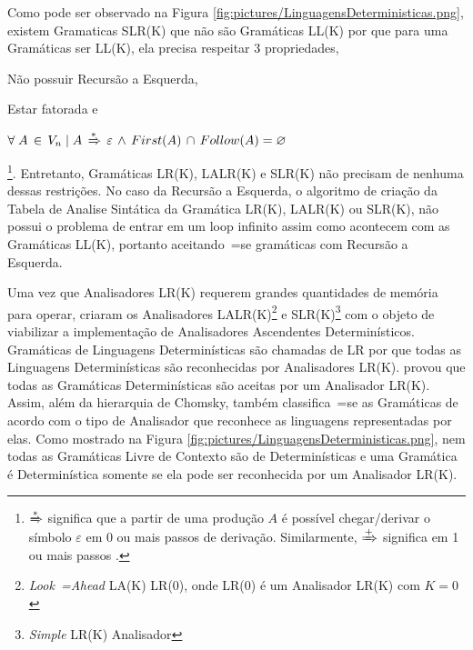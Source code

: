 {    Como pode ser observado na Figura \ref{fig:pictures/LinguagensDeterministicas.png},
    existem Gramaticas SLR(K) que não são Gramáticas LL(K) por que para uma Gramáticas ser LL(K),
    ela precisa respeitar 3 propriedades,
    \begin{inparaenum}
        \item Não possuir Recursão a Esquerda,
        \item Estar fatorada e
        \item $\forall\; A\, \in\, V_n\; |\; A\,
                \xRightarrow{*}\, \varepsilon\,
                \land\, First(A)\, \cap\, Follow(A) = \varnothing$
    \end{inparaenum}
    \cite{ahoCompilerDragonBook}\footnote{$\xRightarrow{*}$ significa que
    a partir de uma produção $A$ é possível chegar\slash{}derivar o
    símbolo $\varepsilon$ em 0 ou mais passos de derivação.
    Similarmente,
    $\xRightarrow{+}$ significa em 1 ou mais passos \cite{contextSensitiveParsing}.}.
    Entretanto,
    Gramáticas LR(K), LALR(K) e
    SLR(K) não precisam de nenhuma dessas restrições.
    No caso da Recursão a Esquerda,
    o algoritmo de criação da Tabela de Analise Sintática da Gramática LR(K),
    LALR(K) ou SLR(K),
    não possui o problema de entrar em um loop infinito
    assim como acontecem com as Gramáticas LL(K),
    portanto aceitando~=se gramáticas com Recursão a Esquerda.

    Uma vez que Analisadores LR(K) requerem grandes quantidades de memória para operar,
     criaram os Analisadores
    LALR(K)\footnote{\textit{Look~=Ahead} LA(K) LR(0),
    onde LR(0) é um Analisador LR(K) com $K=0$
    } e
    SLR(K)\footnote{\textit{Simple} LR(K) Analisador} com o objeto de
    viabilizar a implementação de Analisadores Ascendentes Determinísticos.
    Gramáticas de Linguagens Determinísticas são chamadas de LR por que todas
    as Linguagens Determinísticas são reconhecidas por Analisadores LR(K).
     provou que todas as Gramáticas
    Determinísticas são aceitas por um Analisador LR(K).
    Assim,
    além da hierarquia de Chomsky,
    também classifica~=se as Gramáticas de acordo com o tipo de
    Analisador que reconhece as linguagens representadas por elas.
    Como mostrado na Figura \ref{fig:pictures/LinguagensDeterministicas.png},
    nem todas as Gramáticas Livre de Contexto são de Determinísticas e
    uma Gramática é Determinística somente se ela pode ser reconhecida por um Analisador LR(K).

}
